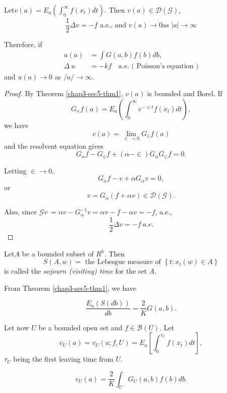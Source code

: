 \begin{thm}\label{chap3-sec5-thm2}%
  Let\pageoriginale $v(a) = E_a (\int^\infty_0 f(x_t) dt)$. Then $v(a)
  \in \mathscr{D} (\mathscr{G})$,  
  $$
  \frac{1}{2} \Delta v = -f \text{ \ a.e., and \ } v(a) \to 0 \text{
    \ as  \ }
  | a | \to \infty 
  $$

Therefore, if
\begin{align*}
u(a)&  = \int G(a, b) f(b) db, \\
\Delta ~u & = - k f  \quad \text{a.e. ( Poisson's equation })
  \end{align*}
  and $u(a) \to 0$ as $/a/ \to \infty$.
\end{thm}

\begin{proof}
By Theorem \ref{chap3-sec5-thm1}, $v(a)$ is bounded and Borel. If
  $$
  G_\in f(a) = E_a \left(\int^\infty_0 e^{- \in t} f (x_t) dt\right),
  $$
  we have
  $$
  v(a) = \lim_{\in \to 0} G_\in f(a)
  $$
  and the resolvent equation gives
  $$
  G_\alpha f - G_\in f + (\alpha - \in) G_\alpha G_\in f = 0.
  $$


Letting $\in \to 0$,
$$
G_\alpha f - v+ \alpha G_\alpha v=0,
$$
or
$$ 
v = G_\alpha (f + \alpha v) \in \mathscr{D} (\mathscr{G}).
$$

Also, since $\mathscr{G} v\ = \alpha v - G^{-1}_\alpha v = \alpha v -
f - \alpha v = -f$, a.e., 
$$
\frac{1}{2}\Delta v = - f ~ a. e.
$$
\end{proof}

\begin{defi*}
Let\pageoriginale $A$ be a bounded subset of $R^k$. Then
$$
S(A, w) = \text{ the Lebesgue measure of } \left\{ t : x_t (w) \in A
\right \} 
$$
is called the \textit{sojourn (visiting) time} for the set $A$.
\end{defi*}

From Theorem \ref{chap3-sec5-thm1}, we have
\begin{thm}\label{chap3-sec5-thm3}%
$$
\frac{E_a (S(db))}{db} = \frac{2}{K} G(a, b).
$$
\end{thm}

Let now $U$ be a bounded open set and $f \in \mathscr{B}(U)$. Let
$$
v_U(a) = v_U (a; f, U) = E_a \left[\int^{\tau_U}_0 f(x_t) dt\right],
$$
$\tau_U$ being the first leaving time from $U$.

\begin{thm}\label{chap3-sec5-thm4} %
  $$
  v_U (a) = \frac{2}{K} \int_U G_U (a, b) f(b) db. 
  $$
\end{thm}

